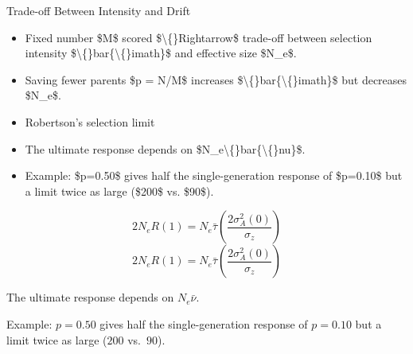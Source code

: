 \documentclass[10pt, aspectratio=169]{ctexbeamer}
\begin{document}
\begin{frame}{Trade-off Between Intensity and Drift}
  \begin{itemize}
    \item Fixed number \$M\$ scored \$\textbackslash\{\}Rightarrow\$ trade-off between selection intensity \$\textbackslash\{\}bar\{\textbackslash\{\}imath\}\$ and effective size \$N\_e\$.
    \item Saving fewer parents \$p = N/M\$ increases \$\textbackslash\{\}bar\{\textbackslash\{\}imath\}\$ but decreases \$N\_e\$.
    \item Robertson’s selection limit
    \item The ultimate response depends on \$N\_e\textbackslash\{\}bar\{\textbackslash\{\}nu\}\$.
    \item Example: \$p=0.50\$ gives half the single-generation response of \$p=0.10\$ but a limit twice as large (\$200\$ vs. \$90\$).
  \end{itemize}
  \[
    2N_{e}R(1)=N_{e}\bar{\tau}\left(\frac{2\sigma_{A}^{2}(0)}{\sigma_{z}}\right) \tag{26.22}
  \]
  \[
    2N_{e}R(1)=N_{e}\bar{\tau}\left(\frac{2\sigma_{A}^{2}(0)}{\sigma_{z}}\right) \tag{26.22} \] \item<4-> The ultimate response depends on $N_e\bar{\nu}$. \item<5-> Example: $p=0.50$ gives half the single-generation response of $p=0.10$ but a limit twice as large ($200$ vs.\ $90$).
  \]
\end{frame}
\end{document}
